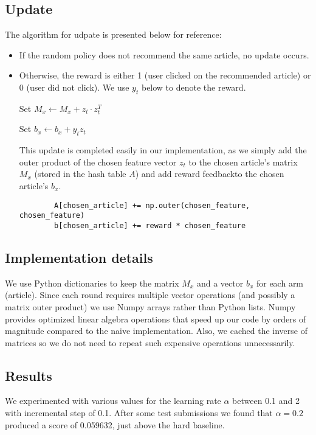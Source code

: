 \documentclass[a4paper, 11pt]{article}
\begin{document}
\subsection{Update}

The algorithm for udpate is presented below for reference:
\newline

\begin{itemize}
    \item If the random policy does not recommend the same article, no update occurs.

    \item Otherwise, the reward is either 1 (user clicked on the recommended article) or 0 (user did not click). We use $y_t$ below to denote the reward.



    Set $M_x \leftarrow M_x + z_t \cdot z_t^T$

    Set $b_x \leftarrow b_x + y_t z_t$

    This update is completed easily in our implementation, as we simply add the outer product of the chosen feature vector $z_t$ to the chosen article's matrix $M_x$ (stored in the hash table $A$) and add reward feedbackto the chosen article's $b_x$.
    \begin{verbatim}
        A[chosen_article] += np.outer(chosen_feature, chosen_feature)
        b[chosen_article] += reward * chosen_feature
    \end{verbatim}
\end{itemize}

\subsection{Implementation details}

We use Python dictionaries to keep the matrix $M_x$ and a vector $b_x$ for each arm (article). Since each round requires multiple vector operations (and possibly a matrix outer product) we use Numpy arrays rather than Python lists. Numpy provides optimized linear algebra operations that speed up our code by orders of magnitude compared to the naive implementation. Also, we cached the inverse of matrices so we do not need to repeat such expensive operations unnecessarily.

\subsection{Results}

We experimented with various values for the learning rate $\alpha$ between 0.1 and 2 with incremental step of 0.1. After some test submissions we found that $\alpha = 0.2$ produced a score of 0.059632, just above the hard baseline.
\end{document}
